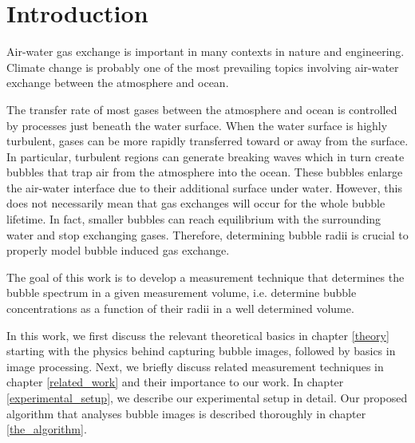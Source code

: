 \chapter{Introduction}
	Air-water gas exchange is important in many contexts in nature and engineering. Climate change is probably one of the most prevailing topics involving air-water exchange between the atmosphere and ocean. 
	
	The transfer rate of most gases between the atmosphere and ocean is controlled by processes just beneath the water surface. When the water surface is highly turbulent, gases can be more rapidly transferred toward or away from the surface. In particular, turbulent regions can generate breaking waves which in turn create bubbles that trap air from the atmosphere into the ocean. These bubbles enlarge the air-water interface due to their additional surface under water. However, this does not necessarily mean that gas exchanges will occur for the whole bubble lifetime. In fact, smaller bubbles can reach equilibrium with the surrounding water and stop exchanging gases. Therefore, determining bubble radii is crucial to properly model bubble induced gas exchange.
	
	The goal of this work is to develop a measurement technique that determines the bubble spectrum in a given measurement volume, i.e. determine bubble concentrations as a function of their radii in a well determined volume. 
	
	In this work, we first discuss the relevant theoretical basics in chapter \ref{theory} starting with the physics behind capturing bubble images, followed by basics in image processing. Next, we briefly discuss related measurement techniques in chapter \ref{related_work} and their importance to our work. In chapter \ref{experimental_setup}, we describe our experimental setup in detail. Our proposed algorithm that analyses bubble images is described thoroughly in chapter \ref{the_algorithm}. 